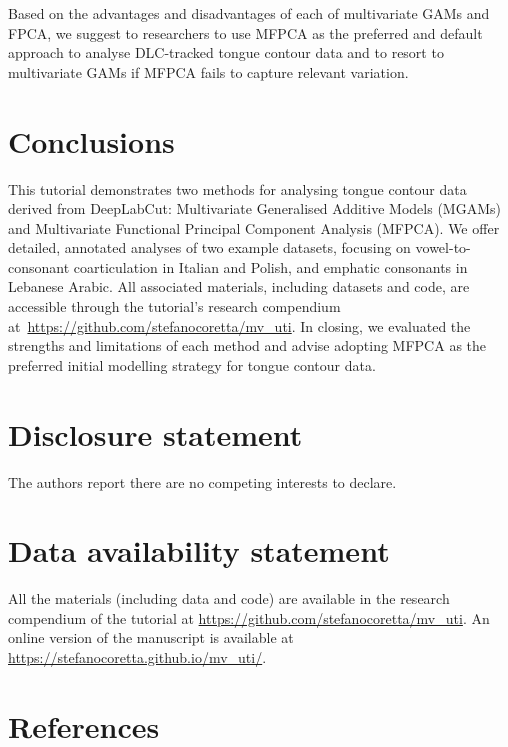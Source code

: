 \documentclass[
  man,
  longtable,
  nolmodern,
  notxfonts,
  notimes,
  colorlinks=true,linkcolor=blue,citecolor=blue,urlcolor=blue]{apa7}
\begin{document}
Based on the advantages and disadvantages of each of multivariate GAMs
and FPCA, we suggest to researchers to use MFPCA as the preferred and
default approach to analyse DLC-tracked tongue contour data and to
resort to multivariate GAMs if MFPCA fails to capture relevant
variation.

\section{Conclusions}\label{conclusions}

This tutorial demonstrates two methods for analysing tongue contour data
derived from DeepLabCut: Multivariate Generalised Additive Models
(MGAMs) and Multivariate Functional Principal Component Analysis
(MFPCA). We offer detailed, annotated analyses of two example datasets,
focusing on vowel-to-consonant coarticulation in Italian and Polish, and
emphatic consonants in Lebanese Arabic. All associated materials,
including datasets and code, are accessible through the tutorial's
research compendium at~\url{https://github.com/stefanocoretta/mv_uti}.
In closing, we evaluated the strengths and limitations of each method
and advise adopting MFPCA as the preferred initial modelling strategy
for tongue contour data.

\section*{Disclosure statement}\label{disclosure-statement}

The authors report there are no competing interests to declare.

\section*{\texorpdfstring{\textbf{Data availability
statement}}{Data availability statement}}\label{data-availability-statement}

All the materials (including data and code) are available in the
research compendium of the tutorial at
\url{https://github.com/stefanocoretta/mv_uti}. An online version of the
manuscript is available at
\url{https://stefanocoretta.github.io/mv_uti/}.

\section{References}\label{references}
\end{document}
